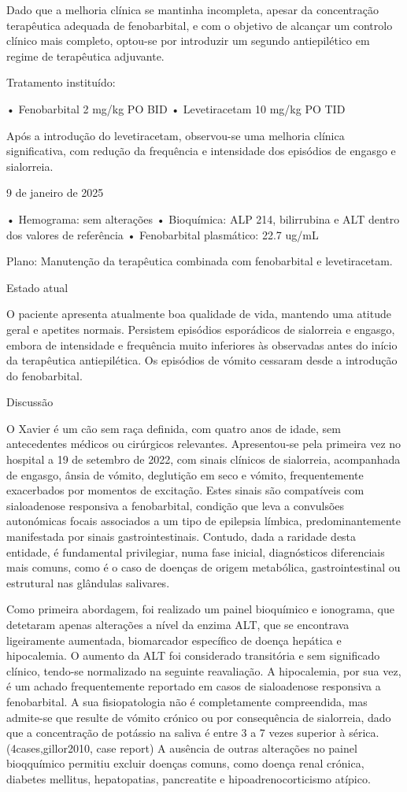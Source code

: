 Dado que a melhoria clínica se mantinha incompleta, apesar da concentração terapêutica adequada de fenobarbital, e com o objetivo de alcançar um controlo clínico mais completo, optou-se por introduzir um segundo antiepilético em regime de terapêutica adjuvante.


Tratamento instituído: 


•	Fenobarbital 2 mg/kg PO BID
•	Levetiracetam 10 mg/kg PO TID


Após a introdução do levetiracetam, observou-se uma melhoria clínica significativa, com redução da frequência e intensidade dos episódios de engasgo e sialorreia.


9 de janeiro de 2025


•	Hemograma: sem alterações
•	Bioquímica: ALP 214, bilirrubina e ALT dentro dos valores de referência
•	Fenobarbital plasmático: 22.7 ug/mL


Plano: Manutenção da terapêutica combinada com fenobarbital e levetiracetam.


Estado atual 


O paciente apresenta atualmente boa qualidade de vida, mantendo uma atitude geral e apetites normais. Persistem episódios esporádicos de sialorreia e engasgo, embora de intensidade e frequência muito inferiores às observadas antes do início da terapêutica antiepilética. Os episódios de vómito cessaram desde a introdução do fenobarbital.

Discussão


O Xavier é um cão sem raça definida, com quatro anos de idade, sem antecedentes médicos ou cirúrgicos relevantes. Apresentou-se pela primeira vez no hospital a 19 de setembro de 2022, com sinais clínicos de sialorreia, acompanhada de engasgo, ânsia de vómito, deglutição em seco e vómito, frequentemente exacerbados por momentos de excitação. Estes sinais são compatíveis com sialoadenose   responsiva a fenobarbital, condição que leva a convulsões autonómicas focais associados a um tipo de epilepsia límbica, predominantemente manifestada por sinais gastrointestinais. Contudo, dada a raridade desta entidade, é fundamental privilegiar, numa fase inicial, diagnósticos diferenciais mais comuns, como é o caso de doenças de origem metabólica, gastrointestinal ou estrutural nas glândulas salivares.


Como primeira abordagem, foi realizado um painel bioquímico e ionograma, que detetaram apenas alterações a nível da enzima ALT, que se encontrava ligeiramente aumentada, biomarcador específico de doença hepática e hipocalemia. O aumento da ALT foi considerado transitória e sem significado clínico, tendo-se normalizado na seguinte reavaliação. A hipocalemia, por sua vez, é um achado frequentemente reportado em casos de sialoadenose responsiva a fenobarbital. A sua fisiopatologia não é completamente compreendida, mas admite-se que resulte de vómito crónico ou por consequência de sialorreia, dado que a concentração de potássio na saliva é entre 3 a 7 vezes superior à sérica. (4cases,gillor2010, case report) A ausência de outras alterações no painel bioqquímico permitiu excluir doenças comuns, como doença renal crónica, diabetes mellitus, hepatopatias, pancreatite e hipoadrenocorticismo atípico.


